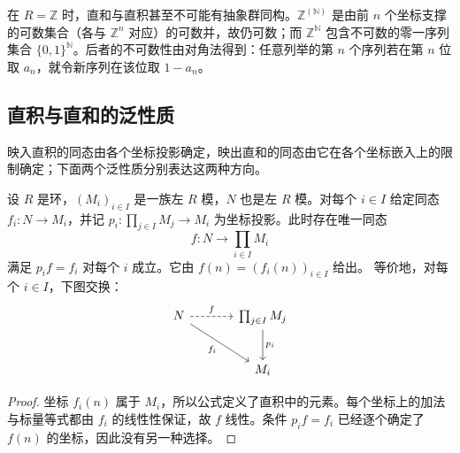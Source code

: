 \begin{example}
	在 \(R=\mathbb Z\) 时，直和与直积甚至不可能有抽象群同构。\(\mathbb Z^{(\mathbb N)}\) 是由前 \(n\) 个坐标支撑的可数集合（各与 \(\mathbb Z^n\) 对应）的可数并，故仍可数；而 \(\mathbb Z^{\mathbb N}\) 包含不可数的零一序列集合 \(\{0,1\}^{\mathbb N}\)。后者的不可数性由对角法得到：任意列举的第 \(n\) 个序列若在第 \(n\) 位取 \(a_n\)，就令新序列在该位取 \(1-a_n\)。
\end{example}

\subsection{直积与直和的泛性质}
\label{b2:subsec:0204:03}

映入直积的同态由各个坐标投影确定，映出直和的同态由它在各个坐标嵌入上的限制确定；下面两个泛性质分别表达这两种方向。

\begin{theorem}\label{b2:thm:module-product-universal}
	设 \(R\) 是环，\((M_i)_{i\in I}\) 是一族左 \(R\) 模，\(N\) 也是左 \(R\) 模。对每个 \(i\in I\) 给定同态 \(f_i:N\to M_i\)，并记 \(p_i:\prod_{j\in I}M_j\to M_i\) 为坐标投影。此时存在唯一同态
	\[
		f:N\longrightarrow\prod_{i\in I}M_i
	\]
	满足 \(p_if=f_i\) 对每个 \(i\) 成立。它由 \(f(n)=(f_i(n))_{i\in I}\) 给出。 等价地，对每个 \(i\in I\)，下图交换：
	\[
		\begin{tikzcd}[column sep=3.5em,row sep=2.5em]
			N\arrow[r,dashed,"f"]\arrow[dr,"f_i"']&\prod_{j\in I}M_j\arrow[d,"p_i"]\\
			&M_i
		\end{tikzcd}
	\]
\end{theorem}
\begin{proof}
	坐标 \(f_i(n)\) 属于 \(M_i\)，所以公式定义了直积中的元素。每个坐标上的加法与标量等式都由 \(f_i\) 的线性性保证，故 \(f\) 线性。条件 \(p_if=f_i\) 已经逐个确定了 \(f(n)\) 的坐标，因此没有另一种选择。
\end{proof}

